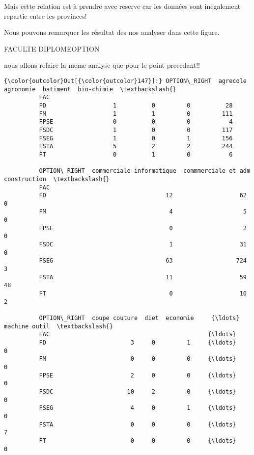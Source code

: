 \documentclass[11pt]{article}
\begin{document}
    Mais cette relation est à prendre avec reserve car les données sont
inegalement repartie entre les provinces!

    Nous pouvons remarquer les résultat des nos analyser dans cette figure.

    FACULTE DIPLOMEOPTION

    nous allons refaire la meme analyse que pour le point precedant!!

            \begin{Verbatim}[commandchars=\\\{\}]
{\color{outcolor}Out[{\color{outcolor}147}]:} OPTION\_RIGHT  agrecole  agronomie  batiment  bio-chimie  \textbackslash{}
          FAC                                                       
          FD                   1          0         0          28   
          FM                   1          1         0         111   
          FPSE                 0          0         0           4   
          FSDC                 1          0         0         117   
          FSEG                 1          0         1         156   
          FSTA                 5          2         2         244   
          FT                   0          1         0           6   
          
          OPTION\_RIGHT  commerciale informatique  commmerciale et adm  construction  \textbackslash{}
          FAC                                                                         
          FD                                  12                   62             0   
          FM                                   4                    5             0   
          FPSE                                 0                    2             0   
          FSDC                                 1                   31             0   
          FSEG                                63                  724             3   
          FSTA                                11                   59            48   
          FT                                   0                   10             2   
          
          OPTION\_RIGHT  coupe couture  diet  economie     {\ldots}       machine outil  \textbackslash{}
          FAC                                             {\ldots}                       
          FD                        3     0         1     {\ldots}                   0   
          FM                        0     0         0     {\ldots}                   0   
          FPSE                      2     0         0     {\ldots}                   0   
          FSDC                     10     2         0     {\ldots}                   0   
          FSEG                      4     0         1     {\ldots}                   0   
          FSTA                      0     0         0     {\ldots}                   7   
          FT                        0     0         0     {\ldots}                   0   
          

\end{Verbatim}
\end{document}
